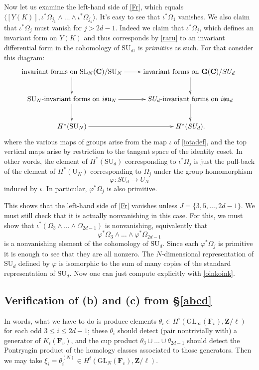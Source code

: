 \documentclass[10pt]{amsart}
\newcommand{\Z}{\mathbf{Z}}
\newcommand{\SL}{\mathrm{SL}}
\newcommand{\C}{\mathbf{C}}
\newcommand{\GL}{\mathrm{GL}}
\theoremstyle{remark}
\begin{document}
%
%
%
%
%
%

Now let us examine the left-hand side of \eqref{Fr}, which equals $\langle [Y(K)], \iota^* \Omega_{j_1} \wedge \dots \wedge \iota^* \Omega_{j_d} \rangle$.  It's easy to see that $\iota^* \Omega_1$ vanishes. We also  claim that $\iota^* \Omega_j$ must vanish for $j > 2d-1$.     Indeed we claim that $\iota^* \Omega_j$, which defines an invariant form on $Y(K)$
and thus corresponds by \eqref{raru} to an invariant differential form in the cohomology of $\mathrm{SU}_d$, is {\em primitive} as such.
  For that consider this diagram: 
   \begin{equation}
 \xymatrix{
 \mbox{invariant forms on $\SL_N(\C)/\mathrm{SU}_N$} \ar[r] \ar[d] &  \mbox{invariant forms on $\mathbf{G}(\C)/SU_d$} \ \ar[d] \\
\mbox{$\mathrm{SU}_N$-invariant forms on $i \mathfrak{su}_N$} \ar[r]\ar[d]  &  \mbox{$SU_d$-invariant forms on $i \mathfrak{su}_d$} \ar[d] . \\
H^*(\mathrm{SU}_N) \ar[r]  & H^*(SU_d).
 }
\end{equation}
where the various maps of groups arise from the map $\iota$ of \eqref{iotadef}, and the top vertical
maps arise by restriction to the tangent space of the identity coset. 
In other words, the element of $H^*(\mathrm{SU}_d)$ corresponding to $\iota^* \Omega_j$
is just the pull-back of the element of $H^*(\mathrm{U}_N)$ corresponding to $\Omega_j$
under the group homomorphism $$\varphi: SU_d \rightarrow U_N$$ 
induced by $\iota$. In particular, $\varphi^* \Omega_j$ is also primitive. 

 This shows that the left-hand side of \eqref{Fr} vanishes unless $J=\{3, 5, \dots, 2d-1\}$.  We must still check that it is actually nonvanishing in this case.
For this, we must show that $\iota^*( \Omega_3 \wedge \dots \wedge \Omega_{2d-1}) $
is nonvanishing, equivalently that
$$ \varphi^* \Omega_3 \wedge \dots \wedge \varphi^* \Omega_{2d-1}$$
is a nonvanishing element of the cohomology of $\mathrm{SU}_d$. Since each $\varphi^* \Omega_j$ is primitive it is enough
to see that they are all nonzero.    The $N$-dimensional representation of $\mathrm{SU}_d$ defined by $\varphi$ is 
 isomorphic to the sum of many copies of the standard representation of $\mathrm{SU}_d$. Now one can just compute explicitly with \eqref{oinkoink}. 

 
  
 \subsection{Verification of  (b) and  (c) from \S \ref{abcd}}
 In words, what we have to do is produce elements $\theta_i \in H^i(\GL_{\infty}(\mathbf{F}_v), \Z/\ell)$
 for each odd $3 \leq i \leq 2d-1$; these $\theta_i$ should  detect (pair nontrivially with) a generator  of $K_i(\mathbf{F}_v)$, and the cup product
 $\theta_3 \cup \dots \cup \theta_{2d-1}$ 
should detect the Pontryagin product of  the homology classes associated to those generators.   Then we 
 may take $\xi_i = \theta_i^{(N)}  \in H^i(\GL_N(\mathbf{F}_v),\Z/\ell)$.
 
\end{document}
